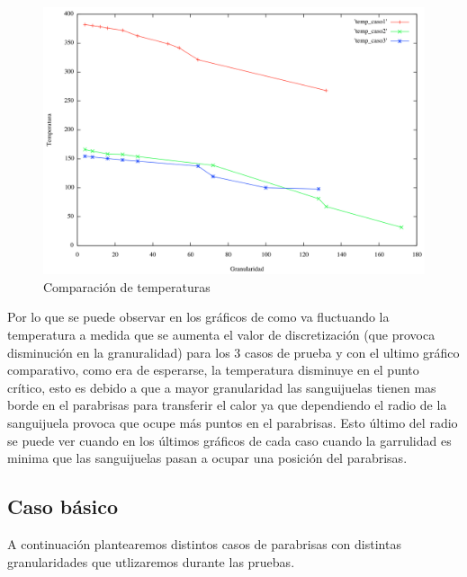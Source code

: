 \begin{figure}[htb]
\begin{center}
        \includegraphics[scale=0.5]{imagenes/comparacion_temperatura.png}
                \caption{Comparación de temperaturas}
        \end{center}

\end{figure}

Por lo que se puede observar en los gráficos de como va fluctuando la temperatura a medida que se aumenta el valor de discretización (que provoca disminución en la granuralidad) para los 3 casos de prueba y con el ultimo gráfico comparativo, como era de esperarse, la temperatura disminuye en el punto crítico, esto es debido a que a mayor granularidad las sanguijuelas tienen mas borde en el parabrisas para transferir el calor ya que dependiendo el radio de la sanguijuela provoca que ocupe más puntos en el parabrisas. Esto último del radio se puede ver cuando en los últimos gráficos de cada caso cuando la garrulidad es minima que las sanguijuelas pasan a ocupar una posición del parabrisas.

\newpage
\subsection{Caso básico}
A continuación plantearemos distintos casos de parabrisas con distintas granularidades que utlizaremos durante las pruebas. 

